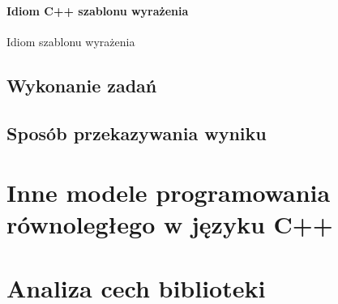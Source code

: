 \paragraph{Idiom C++ szablonu wyrażenia}
  
  Idiom szablonu wyrażenia 

\subsection{Wykonanie zadań}

\subsection{Sposób przekazywania wyniku}

\section{Inne modele programowania równoległego w języku C++}

\section{Analiza cech biblioteki}
